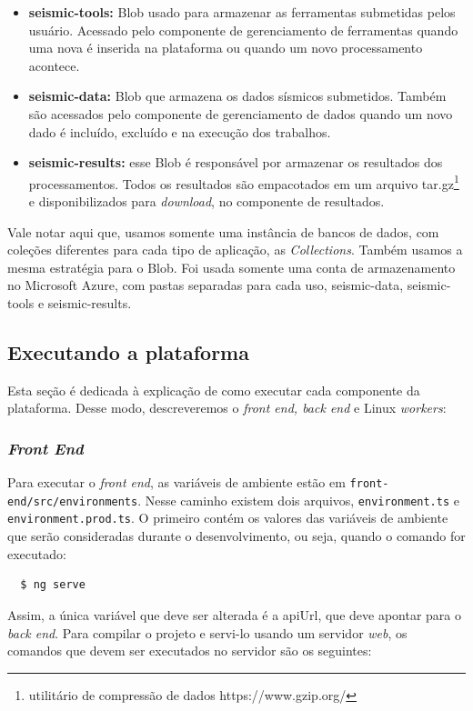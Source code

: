 \documentclass[11pt,twoside]{article}
\begin{document}
\begin{itemize}
  \item \textbf{seismic-tools:} Blob usado para armazenar as ferramentas submetidas pelos usuário. Acessado pelo componente de gerenciamento de ferramentas quando uma nova é inserida na plataforma ou 
  quando um novo processamento acontece.
  \item \textbf{seismic-data:} Blob que armazena os dados sísmicos submetidos. Também são acessados pelo componente de gerenciamento de dados quando um novo dado é incluído, excluído e na execução dos 
  trabalhos.
  \item \textbf{seismic-results:} esse Blob é responsável por armazenar os resultados dos processamentos. Todos os resultados são empacotados em um arquivo tar.gz\footnote{ utilitário de compressão de dados https://www.gzip.org/} e disponibilizados para \emph{download}, 
  no componente de resultados.
\end{itemize}

Vale notar aqui que, usamos somente uma instância de bancos de dados, com coleções diferentes para cada tipo de aplicação, as \emph{Collections}. Também usamos a mesma estratégia para o Blob. Foi usada somente 
uma conta de armazenamento no Microsoft Azure, com pastas separadas para cada uso, seismic-data, seismic-tools e seismic-results. 

\subsection{Executando a plataforma}

Esta seção é dedicada à explicação de como executar cada componente da plataforma. Desse modo, descreveremos o \emph{front end, back end} e Linux \emph{workers}: 

\subsubsection{\emph{Front End}}

Para executar o \emph{front end}, as variáveis de ambiente estão em \texttt{front-end/src/environments}. Nesse caminho existem dois arquivos, \texttt{environment.ts} e \texttt{environment.prod.ts}.
O primeiro contém os valores das variáveis de ambiente que serão consideradas durante o desenvolvimento, ou seja, quando o comando for executado:


  \begin{verbatim}
  $ ng serve
\end{verbatim}

Assim, a única variável que deve ser alterada é a apiUrl, que deve apontar para o \emph{back end}. Para compilar o projeto e servi-lo usando um servidor \emph{web}, os comandos que 
devem ser executados no servidor são os seguintes: 
\end{document}
